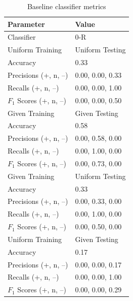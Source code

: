 \documentclass[11pt]{article}
\begin{document}
\begin{table}[H]
	\begin{center}
		\begin{tabular}{|l|l|}			
			\hline
			Parameter & Value \\
			\hline
			Classifier & 0-R \\
			\hline\hline
			Uniform Training & Uniform Testing \\
			\hline
			Accuracy & 0.33 \\
			Precisions (+, n, --) 	& 0.00, 0.00, 0.33 \\
			Recalls (+, n, --) 		& 0.00, 0.00, 1.00 \\
			$F_1$ Scores (+, n, --) & 0.00, 0.00, 0.50 \\
			\hline\hline
			Given Training & Given Testing \\
			\hline
			Accuracy & 0.58 \\
			Precisions (+, n, --) 	& 0.00, 0.58, 0.00 \\
			Recalls (+, n, --) 		& 0.00, 1.00, 0.00 \\
			$F_1$ Scores (+, n, --) & 0.00, 0.73, 0.00 \\
			\hline\hline
			Given Training & Uniform Testing \\
			\hline
			Accuracy & 0.33 \\
			Precisions (+, n, --) 	& 0.00, 0.33, 0.00 \\
			Recalls (+, n, --) 		& 0.00, 1.00, 0.00 \\
			$F_1$ Scores (+, n, --) & 0.00, 0.50, 0.00 \\
			\hline\hline
			Uniform Training & Given Testing \\
			\hline
			Accuracy & 0.17 \\
			Precisions (+, n, --) 	& 0.00, 0.00, 0.17 \\
			Recalls (+, n, --) 		& 0.00, 0.00, 1.00 \\
			$F_1$ Scores (+, n, --) & 0.00, 0.00, 0.29 \\
			\hline
		\end{tabular}
		\caption{Baseline classifier metrics}
		\label{tbl:metrics-base10000}
	\end{center}
\end{table}

\end{document}
